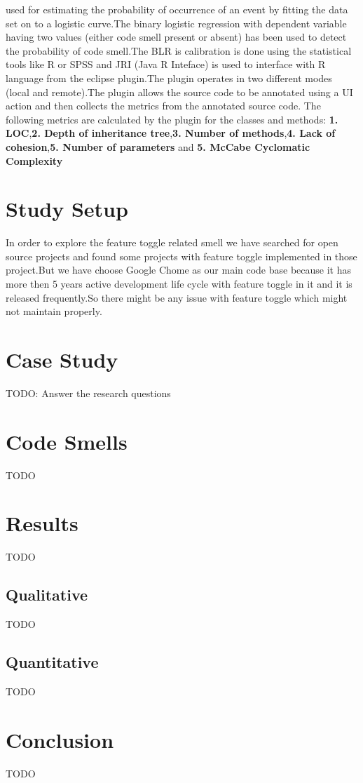\documentclass[conference]{IEEEtran}
\begin{document}
used for estimating the probability of occurrence of an event by fitting the data set on to a logistic curve.The binary logistic regression with dependent variable having two values (either code smell present or absent) has been used to detect the probability of code smell.The BLR is calibration is done using the statistical tools like R or SPSS and JRI (Java R Inteface) is used to interface with R language from the eclipse plugin.The plugin operates in two different modes (local and remote).The plugin allows the source code to be annotated using a UI action and then collects the metrics from the annotated source code. The following metrics are calculated by the plugin for the classes and methods: \textbf{1. LOC},\textbf{2. Depth of inheritance tree},\textbf{3. Number of methods},\textbf{4. Lack of cohesion},\textbf{5. Number of parameters} and \textbf{5. McCabe Cyclomatic Complexity}


\section{Study Setup}
\label{study-setup}
In order to explore the feature toggle related smell we have searched for open source projects and found some projects with feature toggle implemented in those project.But we have choose Google Chome as our main code base because it has more then 5 years active development life cycle with feature toggle in it and it is released frequently.So there might be any issue with feature toggle which might not maintain properly.
\section{Case Study}
\label{results}
TODO: Answer the research questions

\section{Code Smells}
\label{discussion}
TODO

\section{Results}
\label{threats}
TODO
\subsection{Qualitative}
TODO
\subsection{Quantitative}
TODO

\section{Conclusion}
\label{conclusion}
TODO





\balance
\end{document}
